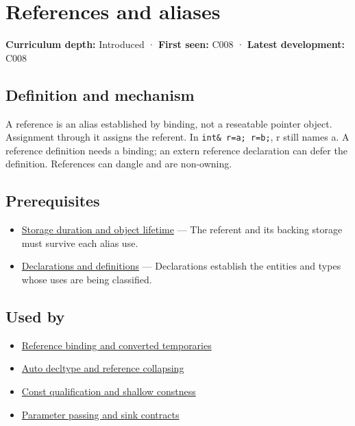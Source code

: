 \hypertarget{appendix-d6d562ca9fbb}{}\label{referencestart:appendix-d6d562ca9fbb}
\section{References and aliases}\label{appendix-d6d562ca9fbb-references-and-aliases}

\textbf{Curriculum depth:} Introduced · \textbf{First seen:} C008 · \textbf{Latest development:} C008

\begin{allmightroledefinition}

\subsection{Definition and mechanism}\label{appendix-d6d562ca9fbb-definition-and-mechanism}

A reference is an alias established by binding, not a reseatable pointer object. Assignment through it assigns the referent. In \texttt{int\&\ r=a;\ r=b;}, r still names a. A reference definition needs a binding; an extern reference declaration can defer the definition. References can dangle and are non-owning.

\end{allmightroledefinition}

\subsection{Prerequisites}\label{appendix-d6d562ca9fbb-prerequisites}

\begin{itemize}
\tightlist
\item
  \hyperref[appendix-0b104bcba06b]{Storage duration and object lifetime} --- The referent and its backing storage must survive each alias use.
\item
  \hyperref[appendix-2e4d494c2d94]{Declarations and definitions} --- Declarations establish the entities and types whose uses are being classified.
\end{itemize}

\subsection{Used by}\label{appendix-d6d562ca9fbb-used-by}

\begin{itemize}
\tightlist
\item
  \hyperref[appendix-37856d997bb0]{Reference binding and converted temporaries}
\item
  \hyperref[appendix-5d4252a42886]{Auto decltype and reference collapsing}
\item
  \hyperref[appendix-c25d60fed375]{Const qualification and shallow constness}
\item
  \hyperref[appendix-d5908f75721f]{Parameter passing and sink contracts}
\end{itemize}

